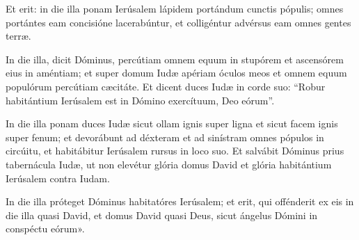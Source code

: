 {\noindent Et erit: in die illa ponam Ierúsalem lápidem portándum cunctis pópulis; omnes portántes eam concisióne lacerabúntur, et colligéntur advérsus eam omnes gentes terræ.

\noindent In die illa, dicit Dóminus, percútiam omnem equum in stupórem et ascensórem eius in améntiam; et super domum Iudæ apériam óculos meos et omnem equum populórum percútiam cæcitáte. Et dicent duces Iudæ in corde suo: “Robur habitántium Ierúsalem est in Dómino exercítuum, Deo eórum”.

\noindent In die illa ponam duces Iudæ sicut ollam ignis super ligna et sicut facem ignis super fenum; et devorábunt ad déxteram et ad sinístram omnes pópulos in circúitu, et habitábitur Ierúsalem rursus in loco suo. Et salvábit Dóminus prius tabernácula Iudæ, ut non elevétur glória domus David et glória habitántium Ierúsalem contra Iudam.

\noindent In die illa próteget Dóminus habitatóres Ierúsalem; et erit, qui offénderit ex eis in die illa quasi David, et domus David quasi Deus, sicut ángelus Dómini in conspéctu eórum».}
\newcommand{\responsoriumi}{\pars{Responsorium 1.} \scriptura{Sedulius, AH 50, 59; \textbf{H182}}

\vspace{-5mm}

\responsorium{VII}{temporalia/resp-oiudaquidereliquisti-CROCHU.gtex}{}

\rubrica{vel ad libitum:}

\vspace{3mm}

\pars{Responsorium 1.} \scriptura{\Rbardot{} Ion. 2, 4-5 \Vbardot{} ibid., 6; \textbf{H418}}

\vspace{-5mm}

\responsorium{VII}{temporalia/resp-fluctustuisuperme-CROCHU.gtex}{}}
